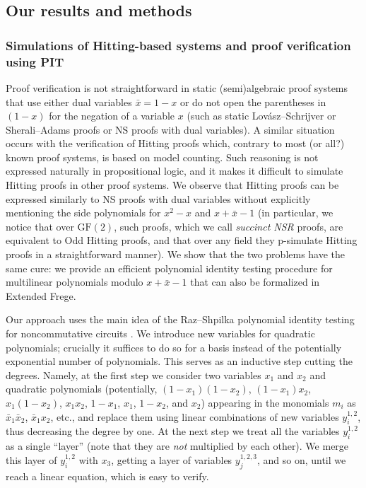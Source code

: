 \documentclass[11pt]{article}
\newcommand{\scterm}[1]{{\textrm{\sc #1}}}
\newcommand{\hit}{\scterm{Hitting}}
\newcommand{\F}{\scterm{Frege}}
\newcommand{\EF}{\scterm{Extended {\F}}}
\newcommand{\ns}{\scterm{NS}}
\newcommand{\nsr}{\scterm{NSR}}
\newcommand{\hitodd}{\scterm{Odd} {\hit}}
\newcommand{\GF}{\mathrm{GF}}
\numberwithin{equation}{section}
\begin{document}
\subsection{Our results and methods}


\subsubsection{Simulations of {\hit}-based systems and proof verification using PIT}
Proof verification is not straightforward in static (semi)algebraic proof systems
that use either dual variables $\bar{x}=1-x$ or do not open the parentheses in $(1-x)$ 
for the negation of a variable $x$ (such as static Lov\'asz--Schrijver
or Sherali--Adams proofs or {\ns} proofs with dual variables).
A similar situation occurs with the verification of {\hit} proofs which,
contrary to most (or all?) known proof systems,
is based on model counting.
Such reasoning is not expressed naturally in propositional logic,
and it makes it difficult to simulate {\hit} proofs in other proof systems.
We observe that {\hit} proofs can be expressed similarly to {\ns} proofs
with dual variables without explicitly mentioning the side polynomials
for $x^2-x$ and $x+\bar{x}-1$ (in particular, we notice
that over $\GF(2)$, such proofs, which we call \emph{succinct {\nsr}} proofs, are equivalent
to {\hitodd} proofs, and that over any field they p-simulate {\hit} proofs in a straightforward manner).
We show that the two problems have the same cure:
we provide an efficient polynomial identity testing
procedure for multilinear polynomials modulo $x+\bar{x}-1$ that can also be formalized in {\EF}.

Our approach uses the main idea of the Raz--Shpilka 
polynomial identity testing for noncommutative circuits \cite{RS05}. 
We introduce new variables for quadratic polynomials; crucially
it suffices to do so for a basis instead of the potentially exponential number of polynomials.
This serves as an inductive step
cutting the degrees.
Namely, at the first step we consider
two variables $x_1$ and $x_2$ and quadratic polynomials
(potentially, 
$(1-x_1)(1-x_2)$,
$(1-x_1)x_2$, 
$x_1(1-x_2)$, 
$x_1x_2$, 
$1-x_1$, 
$x_1$, 
$1-x_2$, and 
$x_2$)
appearing in the monomials $m_i$ as $\bar{x}_1\bar{x}_2$, $\bar{x}_1x_2$, etc., and replace them using linear combinations
of new variables $y^{1,2}_i$,
thus decreasing the degree by one.
At the next step we treat all the variables $y^{1,2}_i$ as a single ``layer''
(note that they are \emph{not} multiplied by each other).
We merge this layer of $y^{1,2}_i$
with $x_3$, getting a layer of variables $y^{1,2,3}_j$, and so on, 
until we reach a linear equation, which is easy to verify.
\end{document}
